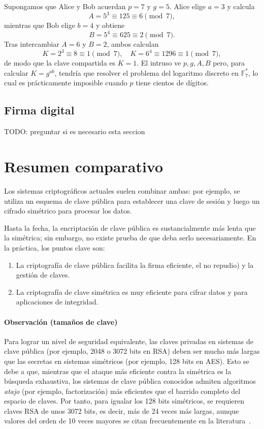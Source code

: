 \begin{ejemplo}
Supongamos que Alice y Bob acuerdan \(p=7\) y \(g=5\).  
Alice elige \(a=3\) y calcula
\[
  A = 5^3 \equiv 125 \equiv 6 \pmod 7,
\]
mientras que Bob elige \(b=4\) y obtiene
\[
  B = 5^4 \equiv 625 \equiv 2 \pmod 7.
\]
Tras intercambiar \(A=6\) y \(B=2\), ambos calculan
\[
  K = 2^3 \equiv 8 \equiv 1 \pmod 7,
  \quad
  K = 6^4 \equiv 1296 \equiv 1 \pmod 7,
\]
de modo que la clave compartida es \(K=1\).  
El intruso ve \(p,g,A,B\) pero, para calcular \(K=g^{ab}\), tendría que resolver el problema del logaritmo discreto en \(\mathbb{F}_7^*\), lo cual es prácticamente imposible cuando \(p\) tiene cientos de dígitos.
\end{ejemplo}

\subsection{Firma digital}
TODO: preguntar si es necesario esta seccion

\section{Resumen comparativo}
Los sistemas criptográficos actuales suelen combinar ambas: por ejemplo, se utiliza un esquema de clave pública para establecer una clave de sesión y luego un cifrado simétrico para procesar los datos.   

Hasta la fecha, la encriptación de clave pública es sustancialmente más lenta que la simétrica; sin embargo, no existe prueba de que deba serlo necesariamente. En la práctica, los puntos clave son:  
\begin{enumerate}
  \item La criptografía de clave pública facilita la firma eficiente, el no repudio) y la gestión de claves.  
  \item La criptografía de clave simétrica es muy eficiente para cifrar datos y para aplicaciones de integridad.  
\end{enumerate}

\paragraph{Observación (tamaños de clave)}  
Para lograr un nivel de seguridad equivalente, las claves privadas en sistemas de clave pública (por ejemplo, 2048 o 3072 bits en RSA) deben ser mucho más largas que las secretas en sistemas simétricos (por ejemplo, 128 bits en AES). Esto se debe a que, mientras que el ataque más eficiente contra la simétrica es la búsqueda exhaustiva, los sistemas de clave pública conocidos admiten algoritmos \emph{atajo} (por ejemplo, factorización) más eficientes que el barrido completo del espacio de claves. Por tanto, para igualar los 128 bits simétricos, se requieren claves RSA de unos 3072 bits, es decir, más de 24 veces más largas, aunque valores del orden de 10 veces mayores se citan frecuentemente en la literatura~\citep{SecurityStrengthRSA}.

